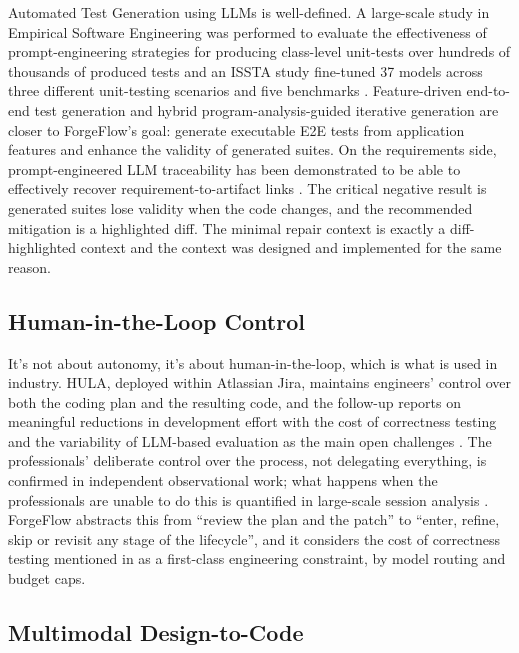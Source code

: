 \documentclass[pdflatex,sn-mathphys-num]{sn-jnl}%
\theoremstyle{thmstyleone}%
\theoremstyle{thmstyletwo}%
\theoremstyle{thmstylethree}%
\begin{document}
Automated Test Generation using LLMs is well-defined. A large-scale study in Empirical Software Engineering was performed to evaluate the effectiveness of prompt-engineering strategies for producing class-level unit-tests over hundreds of thousands of produced tests \cite{r16ouedraogo} and an ISSTA study fine-tuned 37 models across three different unit-testing scenarios and five benchmarks \cite{r17shang}. Feature-driven end-to-end test generation \cite{r18alian} and hybrid program-analysis-guided iterative generation \cite{r19gu} are closer to ForgeFlow's goal: generate executable E2E tests from application features and enhance the validity of generated suites. On the requirements side, prompt-engineered LLM traceability has been demonstrated to be able to effectively recover requirement-to-artifact links \cite{r20alturayeif}. The critical negative result is \cite{r11haroon} generated suites lose validity when the code changes, and the recommended mitigation is a highlighted diff. The minimal repair context is exactly a diff-highlighted context and the context was designed and implemented for the same reason.

\subsection{Human-in-the-Loop Control}\label{sec2.4}

It's not about autonomy, it's about human-in-the-loop, which is what is used in industry. HULA, deployed within Atlassian Jira, maintains engineers' control over both the coding plan and the resulting code, and the follow-up reports on meaningful reductions in development effort \cite{r21takerngsaksiri} with the cost of correctness testing and the variability of LLM-based evaluation as the main open challenges \cite{r22pasuksmit}. The professionals' deliberate control over the process, not delegating everything, is confirmed in independent observational work; what happens when the professionals are unable to do this is quantified in large-scale session analysis \cite{r07tang,r08huang}. ForgeFlow abstracts this from ``review the plan and the patch'' to ``enter, refine, skip or revisit any stage of the lifecycle'', and it considers the cost of correctness testing mentioned in \cite{r22pasuksmit} as a first-class engineering constraint, by model routing and budget caps.

\subsection{Multimodal Design-to-Code}\label{sec2.5}
\end{document}
